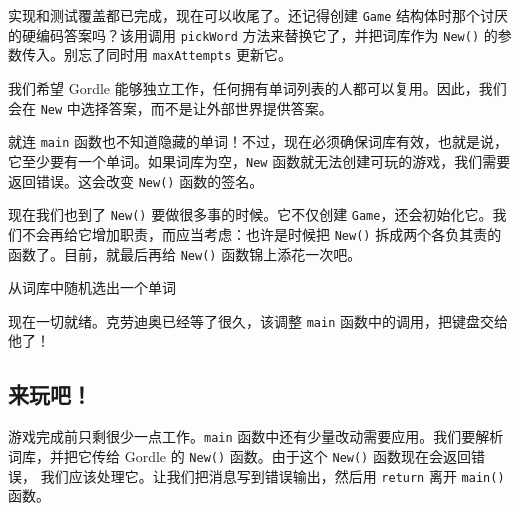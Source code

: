 实现和测试覆盖都已完成，现在可以收尾了。还记得创建 \texttt{Game} 结构体时那个讨厌的硬编码答案吗？该用调用 \texttt{pickWord} 方法来替换它了，并把词库作为 \texttt{New()} 的参数传入。别忘了同时用 \texttt{maxAttempts} 更新它。

我们希望 Gordle 能够独立工作，任何拥有单词列表的人都可以复用。因此，我们会在 \texttt{New} 中选择答案，而不是让外部世界提供答案。

就连 \texttt{main} 函数也不知道隐藏的单词！不过，现在必须确保词库有效，也就是说，它至少要有一个单词。如果词库为空，\texttt{New} 函数就无法创建可玩的游戏，我们需要返回错误。这会改变 \texttt{New()} 函数的签名。

现在我们也到了 \texttt{New()} 要做很多事的时候。它不仅创建 \texttt{Game}，还会初始化它。我们不会再给它增加职责，而应当考虑：也许是时候把 \texttt{New()} 拆成两个各负其责的函数了。目前，就最后再给 \texttt{New()} 函数锦上添花一次吧。


\begin{codeannotations}
\item 从词库中随机选出一个单词
\end{codeannotations}

现在一切就绪。克劳迪奥已经等了很久，该调整 \texttt{main} 函数中的调用，把键盘交给他了！

\subsection{来玩吧！}

游戏完成前只剩很少一点工作。\texttt{main} 函数中还有少量改动需要应用。我们要解析词库，并把它传给 Gordle 的 \texttt{New()} 函数。由于这个 \texttt{New()} 函数现在会返回错误，
我们应该处理它。让我们把消息写到错误输出，然后用 \texttt{return} 离开 \texttt{main()} 函数。

